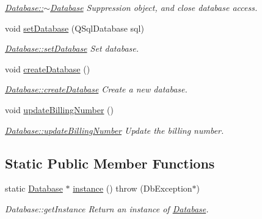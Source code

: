 \begin{DoxyCompactItemize}
\begin{DoxyCompactList}\small\item\em \hyperlink{classDatabases_1_1Database_a457a2dac579f1ffc743f452a2dcbbd5c}{Database\-::$\sim$\-Database} Suppression object, and close database access. \end{DoxyCompactList}\item 
void \hyperlink{classDatabases_1_1Database_a88af2050b210c0d829d166f0f6d9e318}{set\-Database} (Q\-Sql\-Database sql)
\begin{DoxyCompactList}\small\item\em \hyperlink{classDatabases_1_1Database_a88af2050b210c0d829d166f0f6d9e318}{Database\-::set\-Database} Set database. \end{DoxyCompactList}\item 
\hypertarget{classDatabases_1_1Database_a50bde8faf6ab4c5dfdec74dc3ba7bbe7}{void \hyperlink{classDatabases_1_1Database_a50bde8faf6ab4c5dfdec74dc3ba7bbe7}{create\-Database} ()}\label{classDatabases_1_1Database_a50bde8faf6ab4c5dfdec74dc3ba7bbe7}

\begin{DoxyCompactList}\small\item\em \hyperlink{classDatabases_1_1Database_a50bde8faf6ab4c5dfdec74dc3ba7bbe7}{Database\-::create\-Database} Create a new database. \end{DoxyCompactList}\item 
\hypertarget{classDatabases_1_1Database_a17b652086514e0a64d0e452a938ac7a5}{void \hyperlink{classDatabases_1_1Database_a17b652086514e0a64d0e452a938ac7a5}{update\-Billing\-Number} ()}\label{classDatabases_1_1Database_a17b652086514e0a64d0e452a938ac7a5}

\begin{DoxyCompactList}\small\item\em \hyperlink{classDatabases_1_1Database_a17b652086514e0a64d0e452a938ac7a5}{Database\-::update\-Billing\-Number} Update the billing number. \end{DoxyCompactList}\end{DoxyCompactItemize}
\subsection*{Static Public Member Functions}
\begin{DoxyCompactItemize}
\item 
static \hyperlink{classDatabases_1_1Database}{Database} $\ast$ \hyperlink{classDatabases_1_1Database_af75844a67cca710cc2d7edbff95ebe81}{instance} ()  throw (\-Db\-Exception$\ast$)
\begin{DoxyCompactList}\small\item\em Database\-::get\-Instance Return an instance of \hyperlink{classDatabases_1_1Database}{Database}. \end{DoxyCompactList}\end{DoxyCompactItemize}
